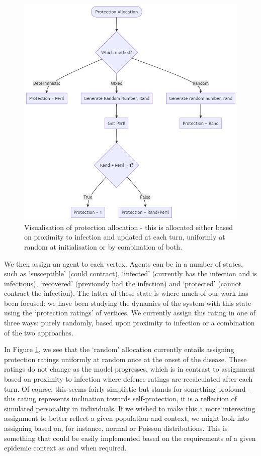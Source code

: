 \documentclass[../report.tex]{subfiles}
\begin{document}
\begin{figure}[!ht] 
  \centering
  \includegraphics[width=0.75\linewidth]{assets/protection}
  \caption{Visualisation of protection allocation - this is allocated either based on proximity to infection and updated at each turn, uniformly at random at initialisation or by combination of both.}
\label{fig:protection}
\end{figure}

We then assign an agent to each vertex. Agents can be in a number of states, such as `susceptible' (could contract), `infected' (currently has the infection and is infectious), `recovered' (previously had the infection) and `protected' (cannot contract the infection). The latter of these state is where much of our work has been focused: we have been studying the dynamics of the system with this state using the `protection ratings' of vertices. We currently assign this rating in one of three ways: purely randomly, based upon proximity to infection or a combination of the two approaches.

In Figure \ref{fig:protection}, we see that the `random' allocation currently entails assigning protection ratings uniformly at random once at the onset of the disease. These ratings do not change as the model progresses, which is in contrast to assignment based on proximity to infection where defence ratings are recalculated after each turn. Of course, this seems fairly simplistic but stands for something profound - this rating represents inclination towards self-protection, it is a reflection of simulated personality in individuals. If we wished to make this a more interesting assignment to better reflect a given population and context, we might look into assigning based on, for instance, normal or Poisson distributions. This is something that could be easily implemented based on the requirements of a given epidemic context as and when required.
\end{document}
